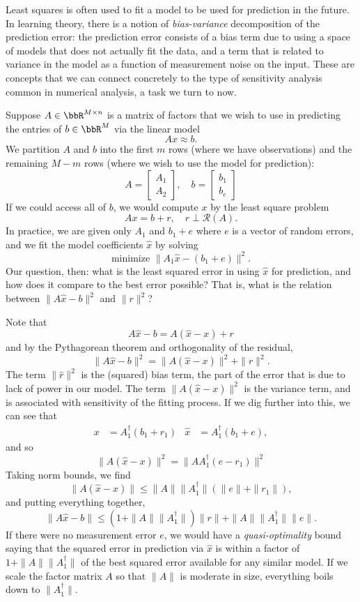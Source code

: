 \documentclass[12pt, leqno]{article} %
\begin{document}
Least squares is often used to fit a model to be used for prediction
in the future.  In learning theory, there is a notion of {\em
  bias-variance} decomposition of the prediction error: the prediction
error consists of a bias term due to using a space of models that does
not actually fit the data, and a term that is related to variance in
the model as a function of measurement noise on the input.  These are
concepts that we can connect concretely to the type of sensitivity
analysis common in numerical analysis, a task we turn to now.

Suppose $A \in \bbR^{M \times n}$ is a matrix of factors that we wish
to use in predicting the entries of $b \in \bbR^M$ via the linear
model
\[
  Ax \approx b.
\]
We partition $A$ and $b$ into the first $m$ rows (where we have
observations) and the remaining $M-m$ rows (where we wish to use
the model for prediction):
\[
  A = \begin{bmatrix} A_1 \\ A_2 \end{bmatrix}, \quad
  b = \begin{bmatrix} b_1 \\ b_e \end{bmatrix}
\]
If we could access all of $b$, we would compute $x$ by the least
square problem
\[
  Ax = b + r, \quad r \perp \mathcal{R}(A).
\]
In practice, we are given only $A_1$ and $b_1 + e$ where
$e$ is a vector of random errors, and we fit the model coefficients
$\hat{x}$ by solving
\[
  \mbox{minimize } \|A_1 \hat{x} - (b_1 + e)\|^2.
\]
Our question, then: what is the least squared error in using $\hat{x}$
for prediction, and how does it compare to the best error possible?
That is, what is the relation between $\|A \hat{x}-b\|^2$ and
$\|r\|^2$?

Note that
\[
  A\hat{x}-b = A(\hat{x}-x) + r
\]
and by the Pythagorean theorem and orthogonality of the residual,
\[
  \|A\hat{x}-b\|^2 = \|A(\hat{x}-x)\|^2 + \|r\|^2.
\]
The term $\|\hat{r}\|^2$ is the (squared) bias term, the part of the
error that is due to lack of power in our model.  The term
$\|A(\hat{x}-x)\|^2$ is the variance term, and is associated with
sensitivity of the fitting process.  If we dig further into this,
we can see that
\begin{align*}
  x &= A_1^\dagger (b_1 + r_1) &
  \hat x &= A_1^\dagger (b_1 + e),
\end{align*}
and so
\[
  \|A(\hat x - x)\|^2 = \|A A_1^\dagger (e-r_1)\|^2
\]
Taking norm bounds, we find
\[
  \|A(\hat x - x)\| \leq \|A\| \|A_1^\dagger\| (\|e\| + \|r_1\|),
\]
and putting everything together,
\[
  \|A\hat{x}-b\| \leq (1+\|A\| \|A_1^\dagger\|) \|r\| + \|A\|
  \|A_1^\dagger\| \|e\|.
\]
If there were no measurement error $e$, we would have a
{\em quasi-optimality} bound saying that the squared error in prediction
via $\hat{x}$ is within a factor of $1 + \|A\| \|A_1^\dagger\|$ of the best
squared error available for any similar model.  If we scale the factor
matrix $A$ so that $\|A\|$ is moderate in size, everything boils down
to $\|A_1^\dagger\|$.
\end{document}
